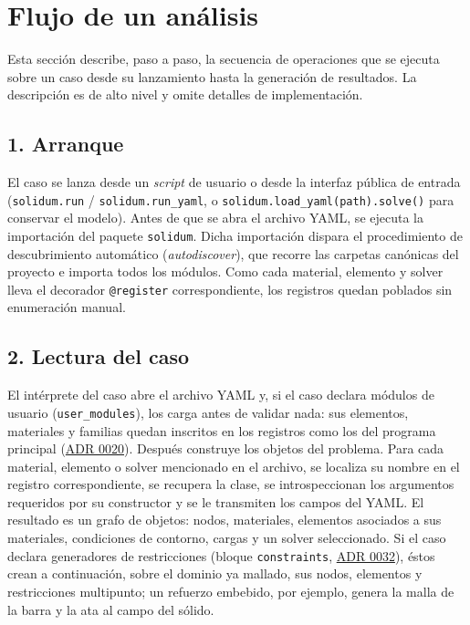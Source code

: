 \documentclass[11pt,oneside]{report}
\begin{document}
\newpage

\chapter{Flujo de un análisis}
\label{cap:3}



Esta sección describe, paso a paso, la secuencia de operaciones que se ejecuta sobre un caso desde su lanzamiento hasta la generación de resultados. La descripción es de alto nivel y omite detalles de implementación.

\section*{1. Arranque}

El caso se lanza desde un \textit{script} de usuario o desde la interfaz pública de entrada (\texttt{solidum.run} / \texttt{solidum.run\_yaml}, o \texttt{solidum.\allowbreak{}load\_\allowbreak{}yaml(path).\allowbreak{}solve()} para conservar el modelo). Antes de que se abra el archivo YAML, se ejecuta la importación del paquete \texttt{solidum}. Dicha importación dispara el procedimiento de descubrimiento automático (\textit{autodiscover}), que recorre las carpetas canónicas del proyecto e importa todos los módulos. Como cada material, elemento y solver lleva el decorador \texttt{@register} correspondiente, los registros quedan poblados sin enumeración manual.

\section*{2. Lectura del caso}

El intérprete del caso abre el archivo YAML y, si el caso declara módulos de usuario (\texttt{user\_modules}), los carga antes de validar nada: sus elementos, materiales y familias quedan inscritos en los registros como los del programa principal (\hyperref[adr:0020]{ADR 0020}). Después construye los objetos del problema. Para cada material, elemento o solver mencionado en el archivo, se localiza su nombre en el registro correspondiente, se recupera la clase, se introspeccionan los argumentos requeridos por su constructor y se le transmiten los campos del YAML. El resultado es un grafo de objetos: nodos, materiales, elementos asociados a sus materiales, condiciones de contorno, cargas y un solver seleccionado. Si el caso declara generadores de restricciones (bloque \texttt{constraints}, \hyperref[adr:0032]{ADR 0032}), éstos crean a continuación, sobre el dominio ya mallado, sus nodos, elementos y restricciones multipunto; un refuerzo embebido, por ejemplo, genera la malla de la barra y la ata al campo del sólido.
\end{document}
